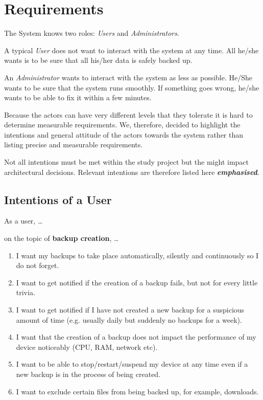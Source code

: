 \newcommand{\relevantreq}[1]{\textit{\textbf{#1}}}
\newcommand{\enumcountsave}{\setcounter{listcounter}{\value{enumi}}}
\newcommand{\enumcountrestore}{\setcounter{enumi}{\value{listcounter}}}

\section{Requirements}
\label{requirements}
The System knows two roles: \emph{Users} and \emph{Administrators}.

A typical \emph{User} does not want to interact with the system at any time.
All he/she wants is to be sure that all his/her data is safely backed
up.

An \emph{Administrator} wants to interact with the system as less as possible.
He/She wants to be sure that the system runs smoothly. If something goes
wrong, he/she wants to be able to fix it within a few minutes.

Because the actors can have very different levels that they tolerate it is hard to
determine measurable requirements. We, therefore, decided to highlight the intentions
and general attitude of the actors towards the system rather than listing precise
and measurable requirements.

Not all intentions must be met within the study project but the might %
impact architectural decisions. Relevant intentions are therefore listed here \relevantreq{emphasised}.


\subsection{Intentions of a User}
As a user, \ldots{}

\begin{flushright}
on the topic of \textbf{backup creation}, \ldots{}
\end{flushright}

\begin{enumerate}
	\item	I want my backups to take place automatically, silently and continuously so I do not forget.
	\item	I want to get notified if the creation of a backup fails, but not for every little trivia.
	\item	I want to get notified if I have not created a new backup for a suspicious amount of time (e.g. usually daily but suddenly no backups for a week).
	\item	I want that the creation of a backup does not impact the performance of my device noticeably (CPU, RAM, network etc).
	\item	I want to be able to stop/restart/suspend my device at any time even if a new backup is in the process of being created.
	\item	I want to exclude certain files from being backed up, for example, downloads.
	\enumcountsave
\end{enumerate}

